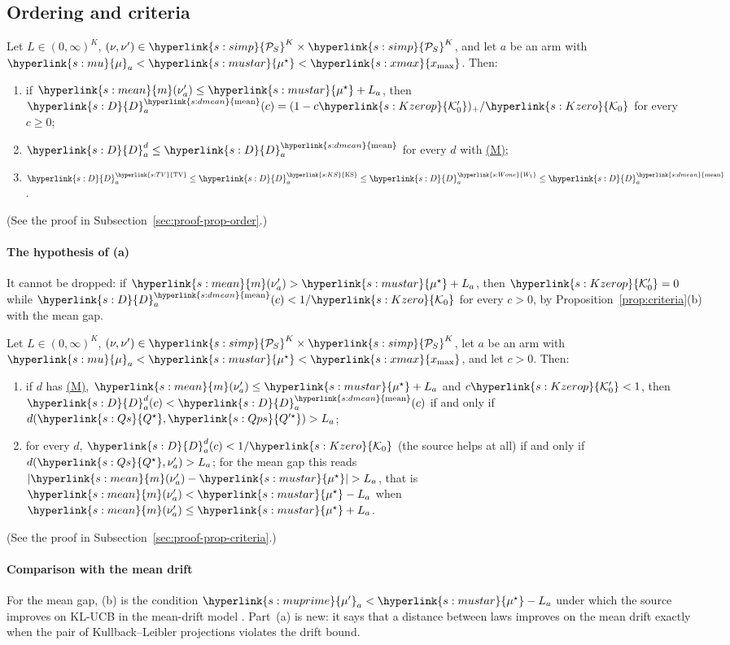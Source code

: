 \documentclass[11pt]{article}
\newcommand{\sy}[2]{{\hyperlink{#1}{#2}}}
\newcommand{\term}[2]{\hyperlink{#1}{#2}}
\newcommand{\xmax}{\sy{s:xmax}{x_{\max}}}
\newcommand{\Simp}{\sy{s:simp}{\mathcal{P}_{S}}}
\newcommand{\mean}{\sy{s:mean}{m}}
\newcommand{\TV}{\sy{s:TV}{\mathrm{TV}}}
\newcommand{\KSd}{\sy{s:KS}{\mathrm{KS}}}
\newcommand{\Wone}{\sy{s:Wone}{W_{1}}}
\newcommand{\dmean}{\sy{s:dmean}{\mathrm{mean}}}
\newcommand{\propM}{\term{s:M}{(M)}}
\newcommand{\mk}{\sy{s:mu}{\mu}}
\newcommand{\mus}{\sy{s:mustar}{\mu^{\star}}}
\newcommand{\mkp}{\sy{s:muprime}{\mu'}}
\newcommand{\Dc}{\sy{s:D}{D}}
\newcommand{\Ko}{\sy{s:Kzero}{\mathcal{K}_{0}}}
\newcommand{\Kop}{\sy{s:Kzerop}{\mathcal{K}'_{0}}}
\newcommand{\Qs}{\sy{s:Qs}{Q^{\star}}}
\newcommand{\Qps}{\sy{s:Qps}{Q'^{\star}}}
\begin{document}
\subsection{Ordering and criteria}

\begin{proposition}[Ordering]\label{prop:order}
Let $L\in(0,\infty)^K$, $(\nu,\nu')\in\Simp^K\times\Simp^K$, and let $a$ be an arm with
$\mk_a<\mus<\xmax$. Then:
\begin{enumerate}
\item[(a)] if $\mean(\nu'_a)\le\mus+L_a$, then $\Dc^{\dmean}_a(c)=(1-c\Kop)_+/\Ko$ for every $c\ge0$;
\item[(b)] $\Dc^d_a\le \Dc^{\dmean}_a$ for every $d$ with \propM{};
\item[(c)] $\Dc^{\TV}_a\le \Dc^{\KSd}_a\le \Dc^{\Wone}_a\le \Dc^{\dmean}_a$.
\end{enumerate}
\end{proposition}

(See the proof in Subsection~\ref{sec:proof-prop-order}.)

\paragraph{The hypothesis of (a)} It cannot be dropped: if $\mean(\nu'_a)>\mus+L_a$, then $\Kop=0$
while $\Dc^{\dmean}_a(c)<1/\Ko$ for every $c>0$, by Proposition~\ref{prop:criteria}(b) with the mean
gap.

\begin{proposition}[Criteria]\label{prop:criteria}
Let $L\in(0,\infty)^K$, $(\nu,\nu')\in\Simp^K\times\Simp^K$, let $a$ be an arm with
$\mk_a<\mus<\xmax$, and let $c>0$. Then:
\begin{enumerate}
\item[(a)] if $d$ has \propM{}, $\mean(\nu'_a)\le\mus+L_a$ and $c\Kop<1$, then $\Dc^d_a(c)<\Dc^{\dmean}_a(c)$
  if and only if $d(\Qs,\Qps)>L_a$;
\item[(b)] for every $d$, $\Dc^d_a(c)<1/\Ko$ (the source helps at all) if and only if
  $d(\Qs,\nu'_a)>L_a$; for the mean gap this reads $|\mean(\nu'_a)-\mus|>L_a$, that is
  $\mean(\nu'_a)<\mus-L_a$ when $\mean(\nu'_a)\le\mus+L_a$.
\end{enumerate}
\end{proposition}

(See the proof in Subsection~\ref{sec:proof-prop-criteria}.)

\paragraph{Comparison with the mean drift} For the mean gap, (b) is the condition
$\mkp_a<\mus-L_a$ under which the source improves on KL-UCB in the mean-drift model
\citep[Section~6]{PMRM26}. Part~(a) is new: it says that a distance between laws improves on the
mean drift exactly when the pair of Kullback--Leibler projections violates the drift bound.
\end{document}
